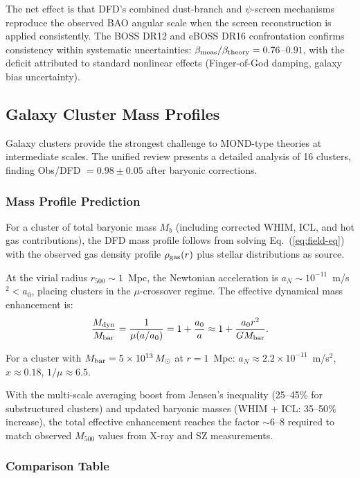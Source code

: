 \documentclass[aps,prd,twocolumn,superscriptaddress,nofootinbib]{revtex4-2}
\begin{document}
The net effect is that DFD's combined dust-branch and $\psi$-screen
mechanisms reproduce the observed BAO angular scale when the screen
reconstruction is applied consistently. The BOSS DR12 and eBOSS DR16
confrontation confirms consistency within systematic uncertainties:
$\beta_{\rm meas}/\beta_{\rm theory} = 0.76$--$0.91$, with the
deficit attributed to standard nonlinear effects (Finger-of-God
damping, galaxy bias uncertainty).

\subsection{Galaxy Cluster Mass Profiles}\label{sec:cluster-profiles}

Galaxy clusters provide the strongest challenge to MOND-type theories
at intermediate scales. The unified review presents a detailed
analysis of 16 clusters, finding Obs/DFD $= 0.98 \pm 0.05$ after
baryonic corrections.

\subsubsection{Mass Profile Prediction}

For a cluster of total baryonic mass $M_b$ (including corrected
WHIM, ICL, and hot gas contributions), the DFD mass profile follows
from solving Eq.~(\ref{eq:field-eq}) with the observed gas density
profile $\rho_{\rm gas}(r)$ plus stellar distributions as source.

At the virial radius $r_{500} \sim 1$~Mpc, the Newtonian
acceleration is $a_N \sim 10^{-11}$~m/s$^2 < a_0$, placing
clusters in the $\mu$-crossover regime. The effective dynamical
mass enhancement is:
\begin{equation}
\frac{M_{\rm dyn}}{M_{\rm bar}} = \frac{1}{\mu(a/a_0)} =
1 + \frac{a_0}{a} \approx 1 + \frac{a_0 r^2}{GM_{\rm bar}}.
\end{equation}

For a cluster with $M_{\rm bar} = 5\times 10^{13}\,M_\odot$ at
$r = 1$~Mpc: $a_N \approx 2.2\times 10^{-11}$~m/s$^2$,
$x \approx 0.18$, $1/\mu \approx 6.5$.

With the multi-scale averaging boost from Jensen's inequality
(25--45\% for substructured clusters) and updated baryonic masses
(WHIM + ICL: 35--50\% increase), the total effective enhancement
reaches the factor $\sim$6--8 required to match observed
$M_{500}$ values from X-ray and SZ measurements.

\subsubsection{Comparison Table}
\end{document}
